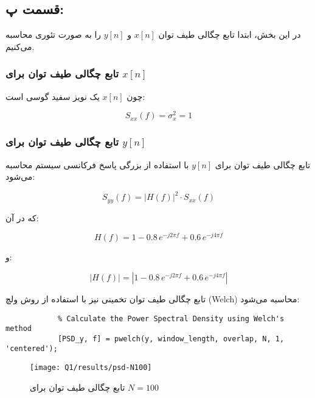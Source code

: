 \documentclass[12pt,onecolumn,a4paper]{article}
\begin{document}
	\FloatBarrier
	\subsection{قسمت پ:}
	
	
	در این بخش، ابتدا تابع چگالی طیف توان \( x[n] \) و \( y[n] \) را به صورت تئوری محاسبه می‌کنیم.
	
	\subsubsection{تابع چگالی طیف توان برای \( x[n] \)}
	چون \( x[n] \) یک نویز سفید گوسی است:
	
	\begin{equation}
		S_{xx}(f) = \sigma_x^2 = 1
	\end{equation}
	
	\subsubsection{تابع چگالی طیف توان برای \( y[n] \)}
	تابع چگالی طیف توان برای \( y[n] \) با استفاده از بزرگی پاسخ فرکانسی سیستم محاسبه می‌شود:
	
	\begin{equation}
		S_{yy}(f) = |H(f)|^2 \cdot S_{xx}(f)
	\end{equation}
	
	که در آن:
	
	\begin{equation}
		H(f) = 1 - 0.8 \, e^{-j 2\pi f} + 0.6 \, e^{-j 4\pi f}
	\end{equation}
	
	و:
	
	\begin{equation}
		|H(f)| = \left| 1 - 0.8 \, e^{-j 2\pi f} + 0.6 \, e^{-j 4\pi f} \right|
	\end{equation}
	
	تابع چگالی طیف توان تخمینی نیز با استفاده از روش ولچ (Welch) محاسبه می‌شود:
	
	\begin{latin}
		\begin{lstlisting}
			% Calculate the Power Spectral Density using Welch's method
			[PSD_y, f] = pwelch(y, window_length, overlap, N, 1, 'centered');
		\end{lstlisting}
	\end{latin}
	
	\begin{figure}[H]
		\centering
		\texttt{[image: Q1/results/psd-N100]}
		\caption{تابع چگالی طیف توان برای \( N = 100 \)}
		\label{fig:psd-n100}
	\end{figure}
	
\end{document}
